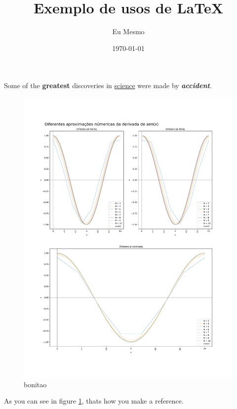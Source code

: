 \documentclass[12pt]{article}
\title{Exemplo de usos de LaTeX}
\author{Eu Mesmo}
\date{\today}
\begin{document}
\maketitle


Some of the \textbf{greatest}
discoveries in \underline{science} 
were made by \textbf{\textit{accident}}.




\begin{figure}[H] %
    \centering
    \includegraphics[width=0.9\linewidth]{derivadas.pdf}
    \caption{bonitao}
    \label{fig:derivadas}
\end{figure}
As you can see in figure \ref{fig:derivadas}, thats how you make a reference.
\end{document}
